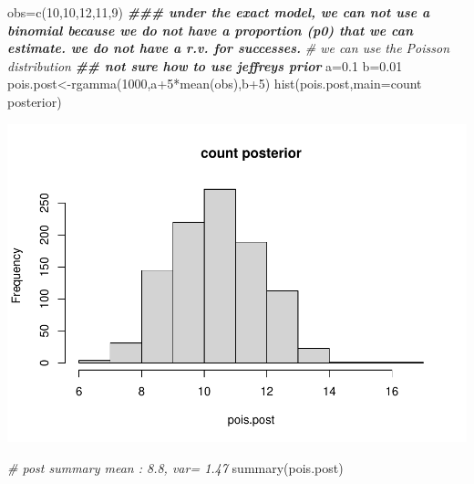 \documentclass[
]{book}
\newenvironment{Shaded}{\begin{snugshade}}{\end{snugshade}}
\newcommand{\AttributeTok}[1]{\textcolor[rgb]{0.77,0.63,0.00}{#1}}
\newcommand{\CommentTok}[1]{\textcolor[rgb]{0.56,0.35,0.01}{\textit{#1}}}
\newcommand{\DecValTok}[1]{\textcolor[rgb]{0.00,0.00,0.81}{#1}}
\newcommand{\DocumentationTok}[1]{\textcolor[rgb]{0.56,0.35,0.01}{\textbf{\textit{#1}}}}
\newcommand{\FloatTok}[1]{\textcolor[rgb]{0.00,0.00,0.81}{#1}}
\newcommand{\FunctionTok}[1]{\textcolor[rgb]{0.00,0.00,0.00}{#1}}
\newcommand{\NormalTok}[1]{#1}
\newcommand{\OtherTok}[1]{\textcolor[rgb]{0.56,0.35,0.01}{#1}}
\newcommand{\SpecialCharTok}[1]{\textcolor[rgb]{0.00,0.00,0.00}{#1}}
\newcommand{\StringTok}[1]{\textcolor[rgb]{0.31,0.60,0.02}{#1}}
\theoremstyle{definition}
\theoremstyle{definition}
\theoremstyle{definition}
\theoremstyle{definition}
\theoremstyle{remark}
\begin{document}
\begin{Shaded}
\begin{Highlighting}[]
\NormalTok{ obs}\OtherTok{=}\FunctionTok{c}\NormalTok{(}\DecValTok{10}\NormalTok{,}\DecValTok{10}\NormalTok{,}\DecValTok{12}\NormalTok{,}\DecValTok{11}\NormalTok{,}\DecValTok{9}\NormalTok{)}
 \DocumentationTok{\#\#\# under the exact model, we can not use a binomial because we do not have a proportion (p0) that we can estimate. we do not have a r.v. for \textquotesingle{}successes\textquotesingle{}.}
 \CommentTok{\# we can use the Poisson distribution }
 \DocumentationTok{\#\# not sure how to use jeffreys prior}
\NormalTok{  a}\OtherTok{=}\FloatTok{0.1}
\NormalTok{  b}\OtherTok{=}\FloatTok{0.01}
\NormalTok{  pois.post}\OtherTok{\textless{}{-}}\FunctionTok{rgamma}\NormalTok{(}\DecValTok{1000}\NormalTok{,a}\SpecialCharTok{+}\DecValTok{5}\SpecialCharTok{*}\FunctionTok{mean}\NormalTok{(obs),b}\SpecialCharTok{+}\DecValTok{5}\NormalTok{)}
  \FunctionTok{hist}\NormalTok{(pois.post,}\AttributeTok{main=}\StringTok{\textquotesingle{}count posterior\textquotesingle{}}\NormalTok{)}
\end{Highlighting}
\end{Shaded}

\includegraphics{_main_files/figure-latex/unnamed-chunk-39-1.pdf}

\begin{Shaded}
\begin{Highlighting}[]
  \CommentTok{\# post summary  mean : 8.8,  var= 1.47}
  \FunctionTok{summary}\NormalTok{(pois.post)}
\end{Highlighting}
\end{Shaded}
\end{document}
